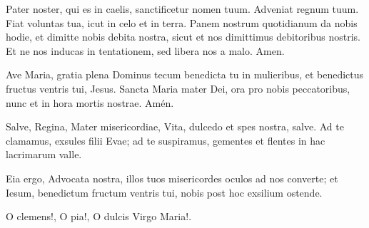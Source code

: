 { %
\renewcommand{\lyricfont}{
  \sffamily
  \large  %
}

\beginverse \chordsoff
Pater noster, qui es in caelis,
sanctificetur nomen tuum.
Adveniat regnum tuum.
Fiat voluntas tua, 
icut in celo et in terra.
\vspace{0.3cm}
Panem nostrum quotidianum 
da nobis hodie,
et dimitte nobis debita nostra,
sicut et nos dimittimus 
debitoribus nostris.
Et ne nos inducas 
in tentationem,
sed libera nos a malo.
Amen.
\endverse
\endsong


\beginverse \chordsoff
Ave Maria, gratia plena
Dominus tecum
benedicta tu in mulieribus,
et benedictus fructus ventris tui, Jesus.
\vspace{0.3cm}
Sancta Maria mater Dei,
ora pro nobis peccatoribus,
nunc et in hora mortis nostrae.
Amén.
\endverse
\endsong

\beginverse \chordsoff
Salve, Regina, Mater misericordiae,
Vita, dulcedo et spes nostra, salve.
Ad te clamamus, exsules filii Evae;
ad te suspiramus, gementes et flentes
in hac lacrimarum valle.

Eia ergo, Advocata nostra,
illos tuos misericordes oculos 
ad nos converte;
et Iesum, benedictum fructum ventris tui,
nobis post hoc exsilium ostende.

O clemens!, O pia!,
O dulcis Virgo Maria!.
\endverse
\endsong

}